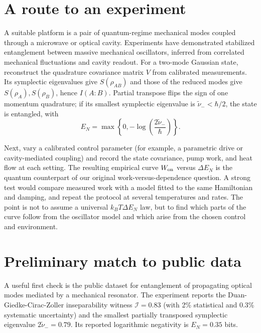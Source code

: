 \documentclass[9pt]{article}
\begin{document}
\section{A route to an experiment}
A suitable platform is a pair of quantum-regime mechanical modes coupled through a microwave or optical cavity. Experiments have demonstrated stabilized entanglement between massive mechanical oscillators, inferred from correlated mechanical fluctuations and cavity readout.\cite{ockeloen2018} For a two-mode Gaussian state, reconstruct the quadrature covariance matrix $V$ from calibrated measurements. Its symplectic eigenvalues give $S(\rho_{AB})$ and those of the reduced modes give $S(\rho_A),S(\rho_B)$, hence $I(A\!:\!B)$. Partial transpose flips the sign of one momentum quadrature; if its smallest symplectic eigenvalue is $\tilde\nu_-<\hbar/2$, the state is entangled, with
\begin{equation}
 E_N=\max\!\left\{0,-\log\!\left(\frac{2\tilde\nu_-}{\hbar}\right)\right\}.
\end{equation}

Next, vary a calibrated control parameter (for example, a parametric drive or cavity-mediated coupling) and record the state covariance, pump work, and heat flow at each setting. The resulting empirical curve $W_{\rm on}$ versus $\Delta E_N$ is the quantum counterpart of our original work-versus-dependence question. A strong test would compare measured work with a model fitted to the same Hamiltonian and damping, and repeat the protocol at several temperatures and rates. The point is not to assume a universal $k_BT\Delta E_N$ law, but to find which parts of the curve follow from the oscillator model and which arise from the chosen control and environment.


\section{Preliminary match to public data}
A useful first check is the public dataset for entanglement of propagating optical modes mediated by a mechanical resonator. The experiment reports the Duan-Giedke-Cirac-Zoller inseparability witness $\mathcal I=0.83$ (with 2\% statistical and 0.3\% systematic uncertainty) and the smallest partially transposed symplectic eigenvalue $2\tilde\nu_-=0.79$. Its reported logarithmic negativity is $E_N=0.35$ bits.\cite{chen2020}
\end{document}
